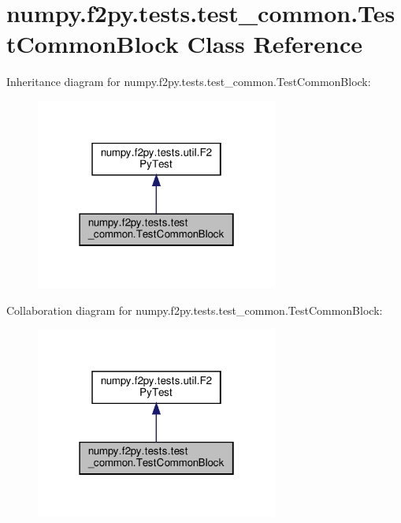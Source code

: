 \hypertarget{classnumpy_1_1f2py_1_1tests_1_1test__common_1_1TestCommonBlock}{}\section{numpy.\+f2py.\+tests.\+test\+\_\+common.\+Test\+Common\+Block Class Reference}
\label{classnumpy_1_1f2py_1_1tests_1_1test__common_1_1TestCommonBlock}


Inheritance diagram for numpy.\+f2py.\+tests.\+test\+\_\+common.\+Test\+Common\+Block\+:
\nopagebreak
\begin{figure}[H]
\begin{center}
\leavevmode
\includegraphics[width=226pt]{classnumpy_1_1f2py_1_1tests_1_1test__common_1_1TestCommonBlock__inherit__graph}
\end{center}
\end{figure}


Collaboration diagram for numpy.\+f2py.\+tests.\+test\+\_\+common.\+Test\+Common\+Block\+:
\nopagebreak
\begin{figure}[H]
\begin{center}
\leavevmode
\includegraphics[width=226pt]{classnumpy_1_1f2py_1_1tests_1_1test__common_1_1TestCommonBlock__coll__graph}
\end{center}
\end{figure}

